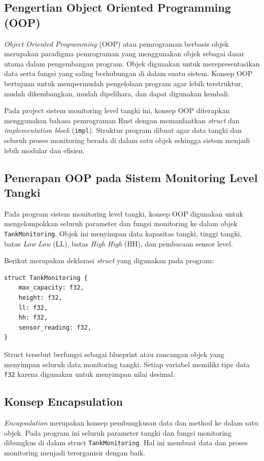 \documentclass[12pt,a4paper]{article}
\begin{document}
\subsection{Pengertian Object Oriented Programming (OOP)}

\textit{Object Oriented Programming} (OOP) atau pemrograman berbasis objek merupakan paradigma pemrograman yang menggunakan objek sebagai dasar utama dalam pengembangan program. Objek digunakan untuk merepresentasikan data serta fungsi yang saling berhubungan di dalam suatu sistem. Konsep OOP bertujuan untuk mempermudah pengelolaan program agar lebih terstruktur, mudah dikembangkan, mudah dipelihara, dan dapat digunakan kembali.

Pada project sistem monitoring level tangki ini, konsep OOP diterapkan menggunakan bahasa pemrograman Rust dengan memanfaatkan \textit{struct} dan \textit{implementation block} (\texttt{impl}). Struktur program dibuat agar data tangki dan seluruh proses monitoring berada di dalam satu objek sehingga sistem menjadi lebih modular dan efisien.

\subsection{Penerapan OOP pada Sistem Monitoring Level Tangki}

Pada program sistem monitoring level tangki, konsep OOP digunakan untuk mengelompokkan seluruh parameter dan fungsi monitoring ke dalam objek \texttt{TankMonitoring}. Objek ini menyimpan data kapasitas tangki, tinggi tangki, batas \textit{Low Low} (LL), batas \textit{High High} (HH), dan pembacaan sensor level.

Berikut merupakan deklarasi \textit{struct} yang digunakan pada program:

\begin{verbatim}
struct TankMonitoring {
    max_capacity: f32,
    height: f32,
    ll: f32,
    hh: f32,
    sensor_reading: f32,
}
\end{verbatim}

Struct tersebut berfungsi sebagai blueprint atau rancangan objek yang menyimpan seluruh data monitoring tangki. Setiap variabel memiliki tipe data \texttt{f32} karena digunakan untuk menyimpan nilai desimal. 

\subsection{Konsep Encapsulation}
\textit{Encapsulation} merupakan konsep pembungkusan data dan method ke dalam satu objek. Pada program ini seluruh parameter tangki dan fungsi monitoring dibungkus di dalam struct \texttt{TankMonitoring}. Hal ini membuat data dan proses monitoring menjadi terorganisir dengan baik.
\end{document}

